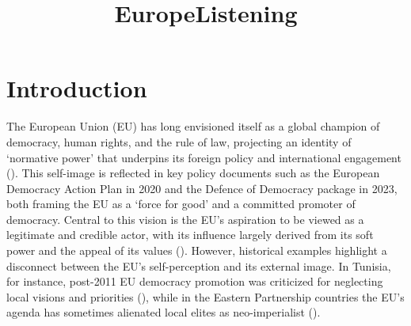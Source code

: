 \documentclass[
  letterpaper,
  DIV=11,
  numbers=noendperiod]{scrartcl}
\title{EuropeListening}
\author{}
\date{}
\begin{document}
\maketitle


\section{Introduction}\label{introduction}

The European Union (EU) has long envisioned itself as a global champion
of democracy, human rights, and the rule of law, projecting an identity
of `normative power' that underpins its foreign policy and international
engagement (). This
self-image is reflected in key policy documents such as the European
Democracy Action Plan in 2020 and the Defence of Democracy package in
2023, both framing the EU as a `force for good' and a committed promoter
of democracy. Central to this vision is the EU's aspiration to be viewed
as a legitimate and credible actor, with its influence largely derived
from its soft power and the appeal of its values
(). However, historical examples
highlight a disconnect between the EU's self-perception and its external
image. In Tunisia, for instance, post-2011 EU democracy promotion was
criticized for neglecting local visions and priorities
(), while in the Eastern
Partnership countries the EU's agenda has sometimes alienated local
elites as neo-imperialist ().
\end{document}
